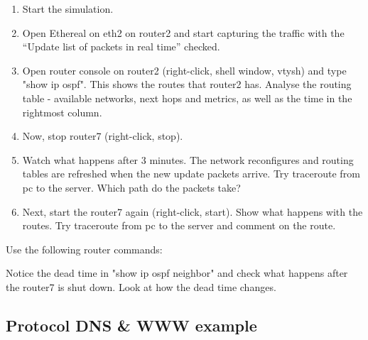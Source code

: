 \begin{enumerate}
 \item	Start the simulation.
 \item	Open Ethereal on eth2 on router2 and start capturing the traffic with
the ``Update list of packets in real time'' checked.
 \item	Open router console on router2 (right-click, shell window, vtysh) and
type "show ip ospf". This shows the routes that router2 has. Analyse the
routing table - available networks, next hops and metrics, as well as the time
in the rightmost column.
 \item	Now, stop router7 (right-click, stop). 
 \item	Watch what happens after 3 minutes. The network reconfigures and
routing tables are refreshed when the new update packets arrive. Try traceroute
from pc to the server. Which path do the packets take?
 \item	Next, start the router7 again (right-click, start). Show what happens
with the routes. Try traceroute from pc to the server and comment on the route.
\end{enumerate}

Use the following router commands:

 
Notice the dead time in "show ip ospf neighbor" and check what happens after
the router7 is shut down. Look at how the dead time changes.

\subsection{Protocol DNS \& WWW example}

